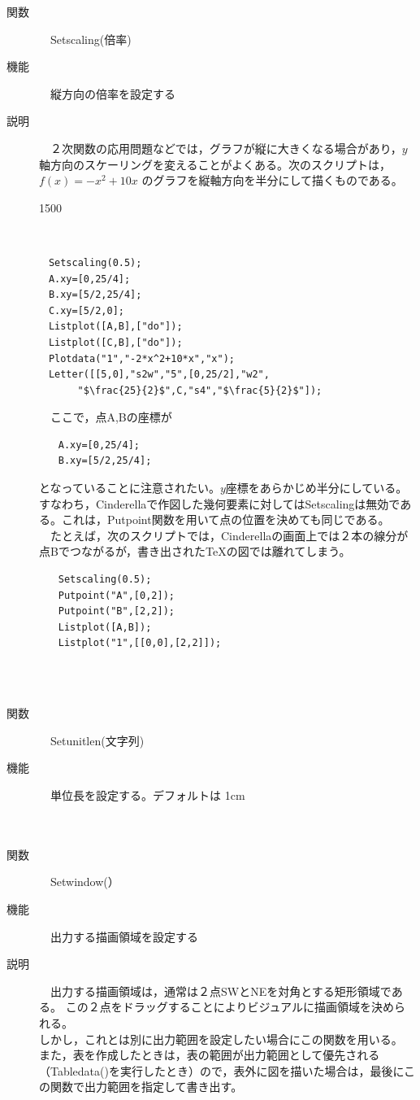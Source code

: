 \documentclass[papersize,a4paper,12pt,uplatex]{jsarticle}
\begin{document}
\begin{description}
\hypertarget{setscaling}{}
\item[関数]　Setscaling(倍率)
\item[機能]　縦方向の倍率を設定する
\item[説明]　２次関数の応用問題などでは，グラフが縦に大きくなる場合があり，$y$軸方向のスケーリングを変えることがよくある。次のスクリプトは，$f(x)=-x^2+10x$ のグラフを縦軸方向を半分にして描くものである。\\
\begin{layer}{150}{0}
\end{layer}
　\\
\begin{verbatim}
　Setscaling(0.5);
　A.xy=[0,25/4];
　B.xy=[5/2,25/4];
　C.xy=[5/2,0];
　Listplot([A,B],["do"]);
　Listplot([C,B],["do"]);
　Plotdata("1","-2*x^2+10*x","x");
　Letter([[5,0],"s2w","5",[0,25/2],"w2",
　　　　"$\frac{25}{2}$",C,"s4","$\frac{5}{2}$"]);
\end{verbatim}
　ここで，点A,Bの座標が
\begin{verbatim}
　　A.xy=[0,25/4];
　　B.xy=[5/2,25/4];
\end{verbatim}
となっていることに注意されたい。$y$座標をあらかじめ半分にしている。すなわち，Cinderellaで作図した幾何要素に対してはSetscalingは無効である。これは，Putpoint関数を用いて点の位置を決めても同じである。\\
　たとえば，次のスクリプトでは，Cinderellaの画面上では２本の線分が点Bでつながるが，書き出された\TeX の図では離れてしまう。
\begin{verbatim}
　　Setscaling(0.5);
　　Putpoint("A",[0,2]);
　　Putpoint("B",[2,2]);
　　Listplot([A,B]);
　　Listplot("1",[[0,0],[2,2]]);
\end{verbatim}
　\\
　\\
\hypertarget{setunitlen}{}
\item[関数]　Setunitlen(文字列)
\item[機能]　単位長を設定する。デフォルトは 1cm\\
　\\
　\\
\hypertarget{setwindow}{}
\item[関数]　Setwindow(）
\item[機能]　出力する描画領域を設定する\\
\item[説明]　出力する描画領域は，通常は２点SWとNEを対角とする矩形領域である。
この２点をドラッグすることによりビジュアルに描画領域を決められる。\\
しかし，これとは別に出力範囲を設定したい場合にこの関数を用いる。\\
また，表を作成したときは，表の範囲が出力範囲として優先される（Tabledata()を実行したとき）ので，表外に図を描いた場合は，最後にこの関数で出力範囲を指定して書き出す。\\
　\\
\end{description}
\end{document}
